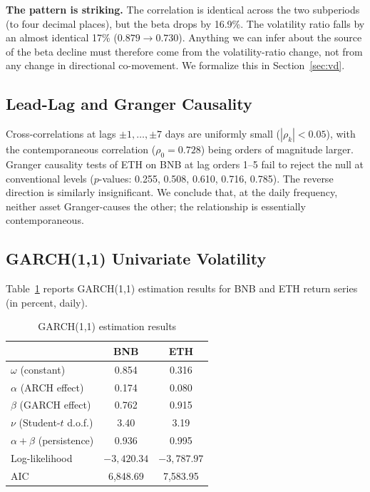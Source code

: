 \documentclass[11pt,a4paper]{article}
\begin{document}
\textbf{The pattern is striking.} The correlation is identical across the two subperiods (to four decimal places), but the beta drops by 16.9\%. The volatility ratio falls by an almost identical 17\% ($0.879 \to 0.730$). Anything we can infer about the source of the beta decline must therefore come from the volatility-ratio change, not from any change in directional co-movement. We formalize this in Section~\ref{sec:vd}.

\subsection{Lead-Lag and Granger Causality} \label{sec:lead}

Cross-correlations at lags $\pm 1, \ldots, \pm 7$ days are uniformly small ($|\rho_k| < 0.05$), with the contemporaneous correlation ($\rho_0 = 0.728$) being orders of magnitude larger. Granger causality tests of ETH on BNB at lag orders 1--5 fail to reject the null at conventional levels ($p$-values: 0.255, 0.508, 0.610, 0.716, 0.785). The reverse direction is similarly insignificant. We conclude that, at the daily frequency, neither asset Granger-causes the other; the relationship is essentially contemporaneous.

\subsection{GARCH(1,1) Univariate Volatility} \label{sec:garch}

Table~\ref{tab:garch} reports GARCH(1,1) estimation results for BNB and ETH return series (in percent, daily).

\begin{table}[H]
\centering
\caption{GARCH(1,1) estimation results}
\label{tab:garch}
\begin{tabular}{lcc}
\toprule
& \textbf{BNB} & \textbf{ETH} \\
\midrule
$\omega$ (constant) & 0.854 & 0.316 \\
$\alpha$ (ARCH effect) & 0.174 & 0.080 \\
$\beta$ (GARCH effect) & 0.762 & 0.915 \\
$\nu$ (Student-$t$ d.o.f.) & 3.40 & 3.19 \\
$\alpha + \beta$ (persistence) & 0.936 & 0.995 \\
Log-likelihood & $-3{,}420.34$ & $-3{,}787.97$ \\
AIC & 6,848.69 & 7,583.95 \\
\bottomrule
\end{tabular}
\end{table}
\end{document}
